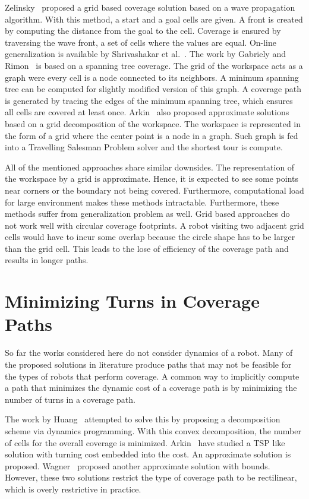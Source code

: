 \documentclass[../main.tex]{subfiles}
\begin{document}
Zelinsky~\cite{Zelinsky1993planning} proposed a grid based coverage solution based on a wave propagation algorithm. With this method, a start and a goal cells are given. A front is created by computing the distance from the goal to the cell. Coverage is ensured by traversing the wave front, a set of cells where the values are equal. On-line generalization is available by Shrivashakar et al.~\cite{shivashankar2011real}. The work by Gabriely and Rimon~\cite{Gabriely2001spanning} is based on a spanning tree coverage. The grid of the workspace acts as a graph were every cell is a node connected to its neighbors. A minimum spanning tree can be computed for slightly modified version of this graph. A coverage path is generated by tracing the edges of the minimum spanning tree, which ensures all cells are covered at least once. Arkin~\cite{arkin2000approximation} also proposed approximate solutions based on a grid decomposition of the workspace. The workspace is represented in the form of a grid where the center point is a node in a graph. Such graph is fed into a Travelling Salesman Problem solver and the shortest tour is compute.

All of the mentioned approaches share similar downsides. The representation of the workspace by a grid is approximate. Hence, it is expected to see some points near corners or the boundary not being covered. Furthermore, computational load for large environment makes these methods intractable. Furthermore, these methods suffer from generalization problem as well. Grid based approaches do not work well with circular coverage footprints. A robot visiting two adjacent grid cells would have to incur some overlap because the circle shape has to be larger than the grid cell. This leads to the lose of efficiency of the coverage path and results in longer paths.


\section{Minimizing Turns in Coverage Paths}
\label{section:minimizing_turns_in_coverage_paths}

So far the works considered here do not consider dynamics of a robot. Many of the proposed solutions in literature produce paths that may not be feasible for the types of robots that perform coverage. A common way to implicitly compute a path that minimizes the dynamic cost of a coverage path is by minimizing the number of turns in a coverage path. 

The work by Huang~\cite{Huang2001optimal} attempted to solve this by proposing a decomposition scheme via dynamics programming. With this convex decomposition, the number of cells for the overall coverage is minimized. Arkin~\cite{arkin2005optimal} have studied a TSP like solution with turning cost embedded into the cost. An approximate solution is proposed. Wagner~\cite{wagner2001approximation} proposed another approximate solution with bounds. However, these two solutions restrict the type of coverage path to be rectilinear, which is overly restrictive in practice.
\end{document}
